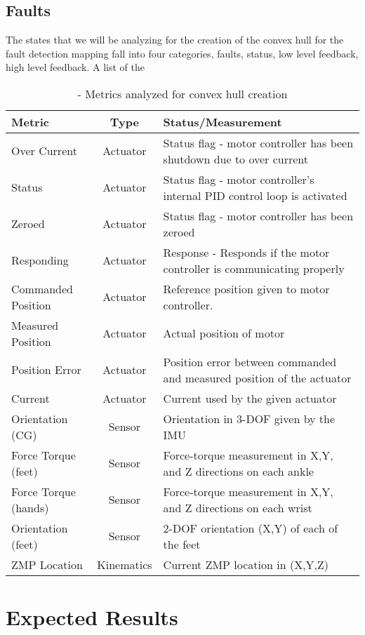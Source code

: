 \subsection{Faults}
\label{sec:faults}
The states that we will be analyzing for the creation of the convex hull for
the fault detection mapping fall into four categories, faults, status, low
level feedback, high level feedback.  A list of the

\begin{table*}[t]
\caption{- Metrics analyzed for convex hull creation}\label{table:states}
\begin{center}
\begin{tabular}{|l|c|l|}\hline
 Metric   &   Type   &   Status/Measurement \\\hline\hline
 Over Current 								& Actuator 							& Status flag - motor controller has been shutdown due to over current				\\\hline
 Status												& Actuator							&	Status flag - motor controller's internal PID control loop is activated 		\\\hline
 Zeroed 											& Actuator							& Status flag - motor controller has been zeroed			 												\\\hline
 Responding 									&	Actuator							&	Response - Responds if the motor controller is communicating properly 			\\\hline
 Commanded Position 					&	Actuator							& Reference position given to motor controller.																\\\hline
 Measured Position 						& Actuator							& Actual position of motor 																										\\\hline
 Position Error								& Actuator							& Position error between commanded and measured position of the actuator			\\\hline
 Current											& Actuator							& Current used by the given actuator 																					\\\hline
 Orientation (CG)							& Sensor								& Orientation in 3-DOF given by the IMU																				\\\hline
 Force Torque (feet)					& Sensor								& Force-torque measurement in X,Y, and Z directions on each ankle							\\\hline
 Force Torque (hands)					& Sensor								& Force-torque measurement in X,Y, and Z directions on each wrist							\\\hline
 Orientation (feet)						& Sensor								& 2-DOF orientation (X,Y) of each of the feet 																\\\hline
 ZMP Location									& Kinematics						& Current ZMP location in (X,Y,Z)																							\\\hline
\end{tabular}
\end{center}
\end{table*}


\section{Expected Results}
\label{sec:expResults}
